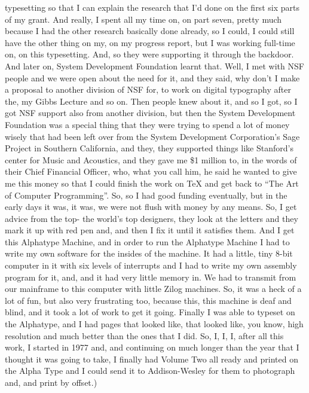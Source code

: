\documentclass[]{article}
\begin{document}
typesetting so that I can explain the research that I'd done on the
first six parts of my grant. And really, I spent all my time on, on part
seven, pretty much because I had the other research basically done
already, so I could, I could still have the other thing on my, on my
progress report, but I was working full-time on, on this typesetting.
And, so they were supporting it through the backdoor. And later on,
System Development Foundation learnt that. Well, I met with NSF people
and we were open about the need for it, and they said, why don't I make
a proposal to another division of NSF for, to work on digital typography
after the, my Gibbs Lecture and so on. Then people knew about it, and so
I got, so I got NSF support also from another division, but then the
System Development Foundation was a special thing that they were trying
to spend a lot of money wisely that had been left over from the System
Development Corporation's Sage Project in Southern California, and they,
they supported things like Stanford's center for Music and Acoustics,
and they gave me \$1 million to, in the words of their Chief Financial
Officer, who, what you call him, he said he wanted to give me this money
so that I could finish the work on TeX and get back to ``The Art of
Computer Programming''. So, so I had good funding eventually, but in the
early days it was, it was, we were not flush with money by any means.
So, I get advice from the top- the world's top designers, they look at
the letters and they mark it up with red pen and, and then I fix it
until it satisfies them. And I get this Alphatype Machine, and in order
to run the Alphatype Machine I had to write my own software for the
insides of the machine. It had a little, tiny 8-bit computer in it with
six levels of interrupts and I had to write my own assembly program for
it, and, and it had very little memory in. We had to transmit from our
mainframe to this computer with little Zilog machines. So, it was a heck
of a lot of fun, but also very frustrating too, because this, this
machine is deaf and blind, and it took a lot of work to get it going.
Finally I was able to typeset on the Alphatype, and I had pages that
looked like, that looked like, you know, high resolution and much better
than the ones that I did. So, I, I, I, after all this work, I started in
1977 and, and continuing on much longer than the year that I thought it
was going to take, I finally had Volume Two all ready and printed on the
Alpha Type and I could send it to Addison-Wesley for them to photograph
and, and print by offset.)
\end{document}
